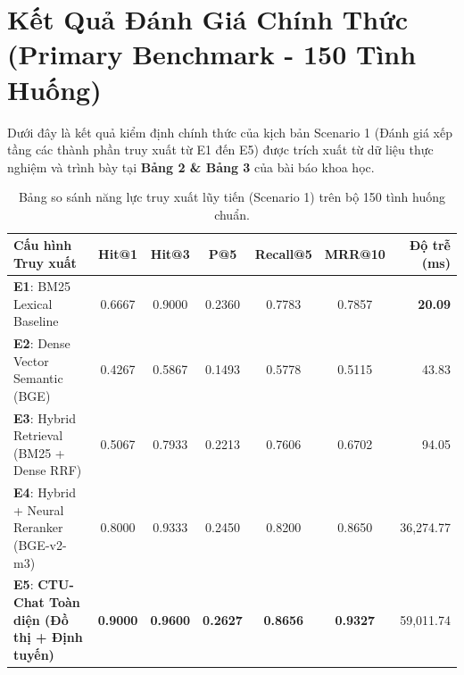\documentclass[a4paper,10pt]{article}
\begin{document}
\section{Kết Quả Đánh Giá Chính Thức (Primary Benchmark - 150 Tình Huống)}

Dưới đây là kết quả kiểm định chính thức của kịch bản Scenario 1 (Đánh giá xếp tầng các thành phần truy xuất từ E1 đến E5) được trích xuất từ dữ liệu thực nghiệm và trình bày tại \textbf{Bảng 2 \& Bảng 3} của bài báo khoa học.

\begin{table}[h!]
\centering
\small
\renewcommand{\arraystretch}{1.2}
\begin{tabularx}{\textwidth}{X c c c c c r}
\toprule
\rowcolor{tableheader}
\textbf{Cấu hình Truy xuất} & \textbf{Hit@1} & \textbf{Hit@3} & \textbf{P@5} & \textbf{Recall@5} & \textbf{MRR@10} & \textbf{Độ trễ (ms)} \\
\midrule
\textbf{E1}: BM25 Lexical Baseline & 0.6667 & 0.9000 & 0.2360 & 0.7783 & 0.7857 & \textbf{20.09} \\
\textbf{E2}: Dense Vector Semantic (BGE) & 0.4267 & 0.5867 & 0.1493 & 0.5778 & 0.5115 & 43.83 \\
\textbf{E3}: Hybrid Retrieval (BM25 + Dense RRF) & 0.5067 & 0.7933 & 0.2213 & 0.7606 & 0.6702 & 94.05 \\
\textbf{E4}: Hybrid + Neural Reranker (BGE-v2-m3) & 0.8000 & 0.9333 & 0.2450 & 0.8200 & 0.8650 & 36,274.77 \\
\rowcolor{successbg}
\textbf{E5}: \textbf{CTU-Chat Toàn diện (Đồ thị + Định tuyến)} & \textbf{0.9000} & \textbf{0.9600} & \textbf{0.2627} & \textbf{0.8656} & \textbf{0.9327} & 59,011.74 \\
\bottomrule
\end{tabularx}
\caption{Bảng so sánh năng lực truy xuất lũy tiến (Scenario 1) trên bộ 150 tình huống chuẩn.}
\label{tab:retrieval_primary}
\end{table}
\end{document}
